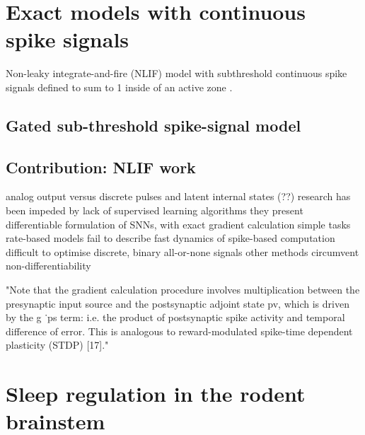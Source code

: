 \documentclass[mphil,deptreport,ai]{infthesis} %
\begin{document}
\chapter{Exact models with continuous spike signals}

Non-leaky integrate-and-fire (NLIF) model with subthreshold continuous spike signals defined to sum to 1 inside of an active zone \cite{Huh2017}.

\section{Gated sub-threshold spike-signal model}

\section{Contribution: NLIF work}

analog output versus discrete pulses and latent internal states (??)
research has been impeded by lack of supervised learning algorithms
they present differentiable formulation of SNNs, with exact gradient calculation
simple tasks
rate-based models fail to describe fast dynamics of spike-based computation
difficult to optimise discrete, binary all-or-none signals
other methods circumvent non-differentiability

"Note that the gradient calculation procedure involves multiplication between the presynaptic input source and the postsynaptic adjoint state pv, which is driven by the g ˙ps term: i.e. the product of postsynaptic spike activity and temporal difference of error. This is analogous to reward-modulated spike-time dependent plasticity (STDP) [17]."


\chapter{Sleep regulation in the rodent brainstem}
\end{document}
